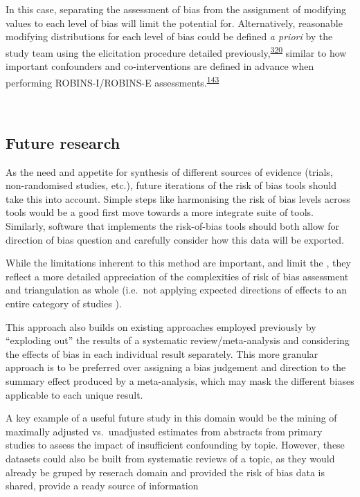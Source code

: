\documentclass[a4paper, twoside]{templates/ociamthesis}
\begin{document}
In this case, separating the assessment of bias from the assignment of modifying values to each level of bias will limit the potential for. Alternatively, reasonable modifying distributions for each level of bias could be defined \emph{a priori} by the study team using the elicitation procedure detailed previously,\textsuperscript{\protect\hyperlink{ref-turner2009}{320}} similar to how important confounders and co-interventions are defined in advance when performing ROBINS-I/ROBINS-E assessments.\textsuperscript{\protect\hyperlink{ref-sterne2016}{143}}

~

\newpage

\hypertarget{future-research}{%
\subsection{Future research}\label{future-research}}

As the need and appetite for synthesis of different sources of evidence (trials, non-randomised studies, etc.), future iterations of the risk of bias tools should take this into account. Simple steps like harmonising the risk of bias levels across tools would be a good first move towards a more integrate suite of tools. Similarly, software that implements the risk-of-bias tools should both allow for direction of bias question and carefully consider how this data will be exported.

While the limitations inherent to this method are important, and limit the , they reflect a more detailed appreciation of the complexities of risk of bias assessment and triangulation as whole (i.e.~not applying expected directions of effects to an entire category of studies ).

This approach also builds on existing approaches employed previously by ``exploding out'' the results of a systematic review/meta-analysis and considering the effects of bias in each individual result separately. This more granular approach is to be preferred over assigning a bias judgement and direction to the summary effect produced by a meta-analysis, which may mask the different biases applicable to each unique result.

A key example of a useful future study in this domain would be the mining of maximally adjusted vs.~unadjusted estimates from abstracts from primary studies to assess the impact of insufficient confounding by topic. However, these datasets could also be built from systematic reviews of a topic, as they would already be gruped by reserach domain and provided the risk of bias data is shared, provide a ready source of information
\end{document}
